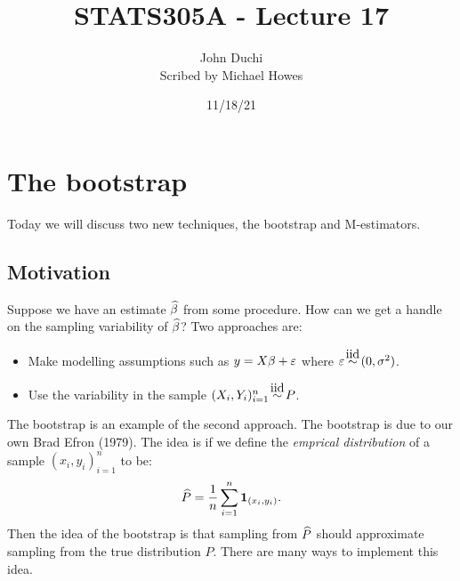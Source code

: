 




\title{STATS305A - Lecture 17}
\author{John Duchi\\ Scribed by Michael Howes}
\date{11/18/21}

\pagestyle{fancy}
\fancyhf{}


\maketitle
\tableofcontents

\section{The bootstrap}
Today we will discuss two new techniques, the bootstrap and M-estimators.
\subsection{Motivation}
Suppose we have an estimate $\widehat{\beta}$ from some procedure. How can we get a handle on the sampling variability of $\widehat{\beta}$? Two approaches are:
\begin{itemize}
    \item Make modelling assumptions such as $y=X\beta + \varepsilon$ where $\eps \iid (0,\sigma^2)$.
    \item Use the variability in the sample $(X_i,Y_i)_{i=1}^n \iid P$.
\end{itemize}
The bootstrap is an example of the second approach. The bootstrap is due to our own Brad Efron (1979). The idea is if we define the \emph{emprical distribution} of a sample $(x_i,y_i)_{i=1}^n$ to be:
\[ \widehat{P}=\frac{1}{n}\sum_{i=1}^n {{\bf 1}}_{(x_i,y_i)}.\]
Then the idea of the bootstrap is that sampling from $\widehat{P}$ should approximate sampling from the true distribution $P$. There are many ways to implement this idea.
